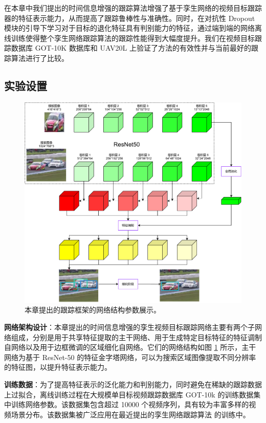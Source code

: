 在本章中我们提出的时间信息增强的跟踪算法增强了基于孪生网络的视频目标跟踪器的特征表示能力，从而提高了跟踪鲁棒性与准确性。同时，在对抗性 Dropout 模块的引导下学习对于目标的退化特征具有判别能力的特征，通过端到端的网络离线训练使得整个孪生网络跟踪算法的跟踪性能得到大幅度提升。我们在视频目标跟踪数据库 GOT-10K \cite{GOT-10k} 数据库和 UAV20L \cite{mueller2016benchmark} 上验证了方法的有效性并与当前最好的跟踪算法进行了比较。
\subsection{实验设置}

\begin{figure}[t]
    \centering
    \includegraphics[width=1.0\textwidth]{Img/end/FPN.pdf}
    \caption{本章提出的跟踪框架的网络结构参数展示。}
    \label{fig:end_FPN}
\end{figure}

\textbf{网络架构设计}：本章提出的时间信息增强的孪生视频目标跟踪网络主要有两个子网络组成，分别是用于共享特征提取的主干网络、用于生成特定目标特征的特征调制自网络以及用于边框微调的区域细化自网络。它们的网络结构如图 \ref{fig:end_FPN} 所示，主干网络为基于 ResNet-50 的特征金字塔网络，可以为搜索区域图像提取不同分辨率的特征图，以提升特征表示能力。

\textbf{训练数据}：为了提高特征表示的泛化能力和判别能力，同时避免在稀缺的跟踪数据上过拟合，离线训练过程在大规模单目标视频跟踪数据库 GOT-10k \cite{GOT-10k} 的训练数据集中训练网络参数。该数据集包含超过 10000 个视频序列，具有较为丰富多样的视频场景分布。该数据集被广泛应用在最近提出的孪生网络跟踪算法 \cite{SiamFC++} 的训练中。

